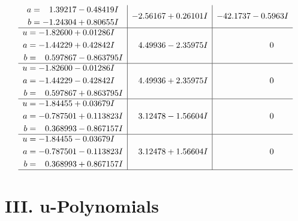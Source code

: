 \documentclass[1p]{elsarticle_modified}
\theoremstyle{definition}
\begin{document}
$$\begin{array}{c|c|c}
\begin{aligned}
a &= \phantom{-}1.39217 - 0.48419 I \\
b &= -1.24304 + 0.80655 I\end{aligned}
 & -2.56167 + 0.26101 I & -42.1737 - 0.5963 I \\ \hline\begin{aligned}
u &= -1.82600 + 0.01286 I \\
a &= -1.44229 + 0.42842 I \\
b &= \phantom{-}0.597867 - 0.863795 I\end{aligned}
 & \phantom{-}4.49936 - 2.35975 I & \phantom{-0.000000 } 0 \\ \hline\begin{aligned}
u &= -1.82600 - 0.01286 I \\
a &= -1.44229 - 0.42842 I \\
b &= \phantom{-}0.597867 + 0.863795 I\end{aligned}
 & \phantom{-}4.49936 + 2.35975 I & \phantom{-0.000000 } 0 \\ \hline\begin{aligned}
u &= -1.84455 + 0.03679 I \\
a &= -0.787501 + 0.113823 I \\
b &= \phantom{-}0.368993 - 0.867157 I\end{aligned}
 & \phantom{-}3.12478 - 1.56604 I & \phantom{-0.000000 } 0 \\ \hline\begin{aligned}
u &= -1.84455 - 0.03679 I \\
a &= -0.787501 - 0.113823 I \\
b &= \phantom{-}0.368993 + 0.867157 I\end{aligned}
 & \phantom{-}3.12478 + 1.56604 I & \phantom{-0.000000 } 0\\
 \hline 
 \end{array}$$\newpage
\newpage\renewcommand{\arraystretch}{1}
\centering \section*{ III. u-Polynomials}
\end{document}

